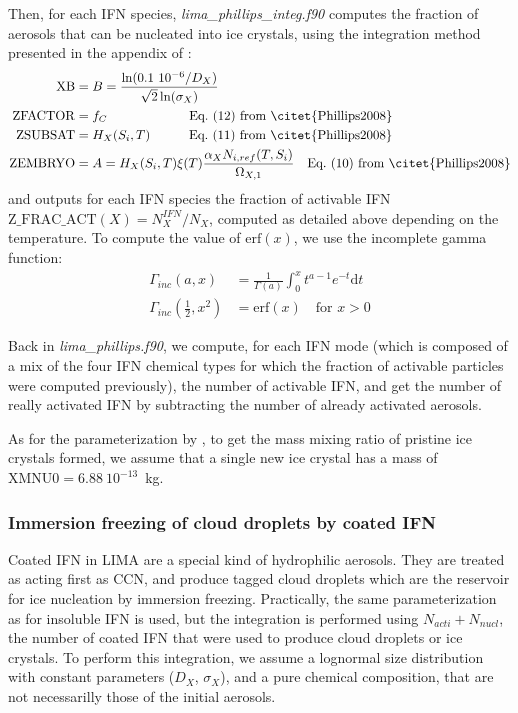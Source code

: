 Then, for each IFN species, \emph{lima\_phillips\_integ.f90} computes the fraction of aerosols that can be nucleated into ice crystals, using the integration method presented in the appendix of \citet{Vie2016}:
\begin{align}
 \mathrm{XB} &= B = \frac{\ln(0.1~10^{-6} / D_X)}{\sqrt{2} \ln(\sigma_X)} \\
 \mathrm{ZFACTOR} &= f_C \quad \quad \quad \quad \quad \quad \text{ Eq.\ (12) from \citet{Phillips2008}} \\
 \mathrm{ZSUBSAT} &= H_X(S_i,T) \quad \quad \quad \text{Eq.\ (11) from \citet{Phillips2008}} \\
 \mathrm{ZEMBRYO} &= A = H_X(S_i,T) \xi(T) \frac{\alpha_X N_{i,ref} (T,S_i)}{\Omega_{X,1}} \quad \text{Eq.\ (10) from \citet{Phillips2008}} \\
\end{align}
and outputs for each IFN species the fraction of activable IFN $\mathrm{Z\_FRAC\_ACT}(X) = N_X^{IFN} / N_X$, computed as detailed above depending on the temperature. To compute the value of $\mathrm{erf}(x)$, we use the incomplete gamma function:
\begin{align*}
 \Gamma_{inc}(a,x) &= \frac{1}{\Gamma(a)} \int_0^x t^{a-1} e^{-t} \mathrm{d}t\\
 \Gamma_{inc}(\frac{1}{2},x^2) &= \mathrm{erf}(x) \quad \textrm{for $x > 0$}
\end{align*}

Back in \emph{lima\_phillips.f90}, we compute, for each IFN mode (which is composed of a mix of the four IFN chemical types for which the fraction of activable particles were computed previously), the number of activable IFN, and get the number of really activated IFN by subtracting the number of already activated aerosols.

As for the parameterization by \citet{Meyers1992}, to get the mass mixing ratio of pristine ice crystals formed, we assume that a single new ice crystal has a mass of $\mathrm{XMNU0} = 6.88~10^{-13}$~kg.

\subsubsection{Immersion freezing of cloud droplets by coated IFN}

Coated IFN in LIMA are a special kind of hydrophilic aerosols. They are treated as acting first as CCN, and produce tagged cloud droplets which are the reservoir for ice nucleation by immersion freezing. Practically, the same parameterization as for insoluble IFN is used, but the integration is performed using $N_{acti}+N_{nucl}$, the number of coated IFN that were used to produce cloud droplets or ice crystals.
To perform this integration, we assume a lognormal size distribution with constant parameters ($D_X$, $\sigma_X$), and a pure chemical composition, that are not necessarilly those of the initial aerosols.




